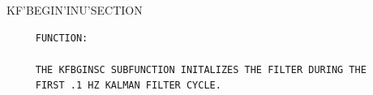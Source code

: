 \begin{frame}
KF'BEGIN'INU'SECTION
\begin{verbatim}
     FUNCTION:

     THE KFBGINSC SUBFUNCTION INITALIZES THE FILTER DURING THE
     FIRST .1 HZ KALMAN FILTER CYCLE.

\end{verbatim}
\end{frame}
